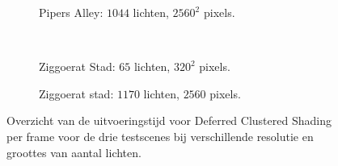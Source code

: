 \begin{figure}[t]
\begin{adjustbox}{minipage=\textwidth, scale=0.55}
    \begin{subfigure}[b]{0.8\textwidth}
      \centering
      \def\svgwidth{\textwidth}
      
      \caption{Pipers Alley: $1044$ lichten, $2560^2$ pixels.}
      \label{fig:cs-frames-stacked:alley-2560}
    \end{subfigure}
  \end{adjustbox} \\
  \begin{adjustbox}{minipage=\textwidth, scale=0.55}
    \begin{subfigure}[b]{0.8\textwidth}
      \centering
      \def\svgwidth{\textwidth}
      
      \caption{Ziggoerat Stad: $65$ lichten, $320^2$ pixels.}
      \label{fig:cs-frames-stacked:city-320}
    \end{subfigure}
  \end{adjustbox}\hspace{-0.075\textwidth}  %
  \begin{adjustbox}{minipage=\textwidth, scale=0.55}
    \begin{subfigure}[b]{0.8\textwidth}
      \centering
      \def\svgwidth{\textwidth}
      
      \caption{Ziggoerat stad: $1170$ lichten, $2560$ pixels.}
      \label{fig:cs-frames-stacked:city-2560}
    \end{subfigure}
  \end{adjustbox}
  \caption{Overzicht van de uitvoeringstijd voor Deferred Clustered Shading per frame voor de
           drie testscenes bij verschillende resolutie en groottes van aantal
           lichten.}
  \label{fig:cs-frames-stacked}
\end{figure}

